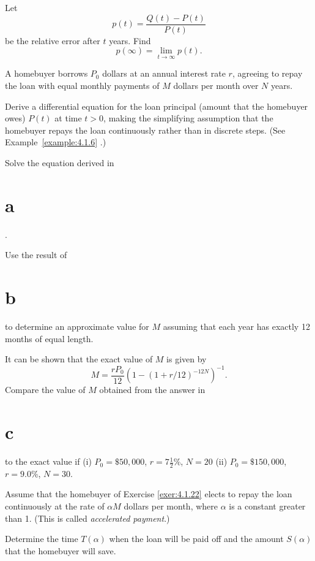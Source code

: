 \begin{exerciselist}
\begin{alist}
    \item %
    Let
    \[
      p(t)=\frac{Q(t)-P(t)}{P(t)}
    \]
    be the relative error after $t$ years. Find
    \[
      p(\infty)=\lim_{t\to\infty}p(t).
    \]
  \end{alist}

  \item\label{exer:4.1.22} A homebuyer borrows $P_{0}$ dollars at an annual interest rate $r$,
        agreeing to repay the loan with equal monthly payments of $M$ dollars per month over $N$
        years.
  \begin{alist}
    \item %
    Derive a differential equation for the loan principal (amount that the homebuyer owes) $P(t)$ at
    time $t>0$, making the simplifying assumption that the homebuyer repays the loan continuously
    rather than in discrete steps. (See Example~\ref{example:4.1.6} .)

    \item %
    Solve the equation derived in \part{a}.

    \item %
    Use the result of \part{b} to determine an approximate value for $M$ assuming that each year has
    exactly 12 months of equal length.

    \item %
    It can be shown that the exact value of $M$ is given by
    \[
      M=\frac{rP_{0}}{12}\left(1-(1+r/12)^{-12N}\right)^{-1}.
    \]
    Compare the value of $M$ obtained from the answer in \part{c} to the exact value if (i)
    $P_{0}=\$50,000$, $r=7{\frac{1}{2}}$\%, $N=20$ (ii) $P_{0}=\$150,000$, $r=9.0$\%, $N=30$.
  \end{alist}

  \item\label{exer:4.1.23} Assume that the homebuyer of Exercise \ref{exer:4.1.22} elects to repay
        the loan continuously at the rate of $\alpha M$ dollars per month, where $\alpha$ is a
        constant greater than 1. (This is called {\color{blue}\it accelerated payment\/}.)
  \begin{alist}
    \item %
    Determine the time $T(\alpha)$ when the loan will be paid off and the amount $S(\alpha)$ that
    the homebuyer will save.


\end{alist}
\end{exerciselist}
